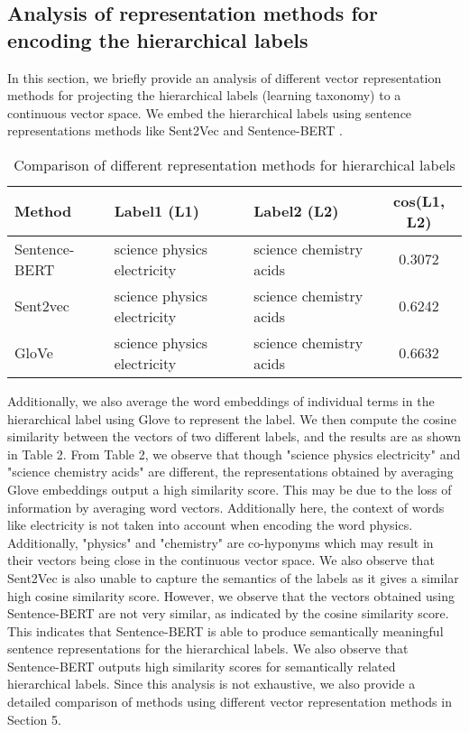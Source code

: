 \documentclass[runningheads, envcountsame, a4paper]{llncs}
\begin{document}
\subsection{Analysis of representation methods for encoding the hierarchical labels}
In this section, we briefly provide an analysis of different vector representation methods for projecting the hierarchical labels (learning taxonomy) to a continuous vector space. We embed the hierarchical labels using sentence representations methods like Sent2Vec \cite{pagliardini2017unsupervised} and Sentence-BERT \cite{reimers-gurevych-2019-sentence}.
             \begin{table}
       \small
 \centering
\caption{Comparison of different representation methods for hierarchical labels}\label{tab1}
\begin{tabular}{p{4.7cm}|p{3cm}|p{3cm}|c}
 Method & Label1 (L1)& Label2 (L2) & cos(L1, L2)\\
\hline\hline
Sentence-BERT &  science  physics  electricity &  science  chemistry  acids & 0.3072\\ 
Sent2vec & science  physics  electricity &  science  chemistry  acids & 0.6242\\ 
GloVe & science  physics  electricity &  science  chemistry  acids & 0.6632\\ 

\hline

\end{tabular}
\end{table}Additionally, we also average the word embeddings of individual terms in the hierarchical label using Glove to represent the label. We then compute the cosine similarity between the vectors of two different labels, and the results are as shown in Table 2. From Table 2, we observe that though "science  physics  electricity" and "science  chemistry  acids" are different, the representations obtained by averaging Glove embeddings output a high similarity score. This may be due to the loss of information by averaging word vectors. Additionally here, the context of words like electricity is not taken into account when encoding the word physics. Additionally, "physics" and "chemistry" are co-hyponyms which may result in their vectors being close in the continuous vector space. We also observe that Sent2Vec is also unable to capture the semantics of the labels as it gives a similar high cosine similarity score. However, we observe that the vectors obtained using Sentence-BERT are not very similar, as indicated by the cosine similarity score. This indicates that Sentence-BERT is able to produce semantically meaningful sentence representations for the hierarchical labels. We also observe that Sentence-BERT outputs high similarity scores for semantically related hierarchical labels. Since this analysis is not exhaustive, we also provide a detailed comparison of methods using different vector representation methods in Section 5.
\end{document}
